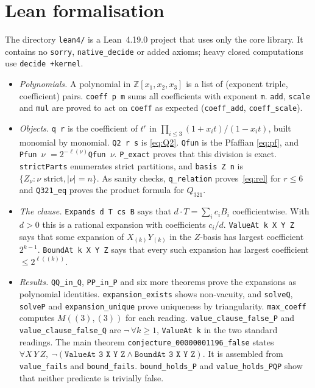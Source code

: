 \documentclass[11pt]{article}
\theoremstyle{definition}
\theoremstyle{remark}
\begin{document}
\section{Lean formalisation}

The directory \texttt{lean4/} is a Lean~4.19.0 project that uses only the core library.
It contains no \texttt{sorry}, \texttt{native\_decide} or added axioms; heavy closed
computations use \texttt{decide +kernel}.
\begin{itemize}\raggedright
\item \emph{Polynomials.} A polynomial in $\mathbb Z[x_1,x_2,x_3]$ is a list of
(exponent triple, coefficient) pairs. \texttt{coeff p m} sums all coefficients with
exponent \texttt{m}. \texttt{add}, \texttt{scale} and \texttt{mul} are proved to act on
\texttt{coeff} as expected (\texttt{coeff\_add}, \texttt{coeff\_scale}).
\item \emph{Objects.} \texttt{q r} is the coefficient of $t^r$ in
$\prod_{i\le3}(1+x_it)/(1-x_it)$, built monomial by monomial. \texttt{Q2 r s} is
\eqref{eq:Q2}. \texttt{Qfun} is the Pfaffian \eqref{eq:pf}, and
\texttt{Pfun $\nu$} $=2^{-\ell(\nu)}$\texttt{Qfun $\nu$}. \texttt{P\_exact} proves that this
division is exact. \texttt{strictParts} enumerates strict partitions, and
\texttt{basis Z n} is $\{Z_\nu:\nu\text{ strict},|\nu|=n\}$. As sanity checks,
\texttt{q\_relation} proves~\eqref{eq:rel} for $r\le6$ and \texttt{Q321\_eq} proves the
product formula for $Q_{321}$.
\item \emph{The clause.} \texttt{Expands d T cs B} says that $d\cdot T=\sum_i c_iB_i$
coefficientwise. With $d>0$ this is a rational expansion with coefficients $c_i/d$.
\texttt{ValueAt k X Y Z} says that some expansion of $X_{(k)}Y_{(k)}$ in the $Z$-basis has
largest coefficient $2^{k-1}$. \texttt{BoundAt k X Y Z} says that every such expansion has
largest coefficient $\le 2^{\ell((k))}$.
\item \emph{Results.} \texttt{QQ\_in\_Q}, \texttt{PP\_in\_P} and six more theorems prove the
expansions as polynomial identities. \texttt{expansion\_exists} shows non-vacuity, and
\texttt{solveQ}, \texttt{solveP} and \texttt{expansion\_unique} prove uniqueness by
triangularity. \texttt{max\_coeff} computes $M((3),(3))$ for each reading.
\texttt{value\_clause\_false\_P} and \texttt{value\_clause\_false\_Q} are
$\neg\,\forall k\ge1$, \texttt{ValueAt k} in the two standard readings.
The main theorem \texttt{conjecture\_00000001196\_false} states
$\forall X\,Y\,Z,\ \neg(\texttt{ValueAt 3 X Y Z} \wedge \texttt{BoundAt 3 X Y Z})$.
It is assembled from \texttt{value\_fails} and \texttt{bound\_fails}.
\texttt{bound\_holds\_P} and \texttt{value\_holds\_PQP} show that neither predicate is
trivially false.
\end{itemize}
\end{document}
